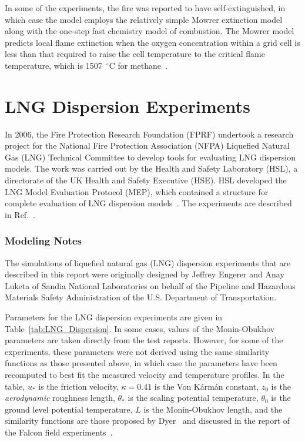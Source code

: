 In some of the experiments, the fire was reported to have self-extinguished, in which case the model employs the relatively simple Mowrer extinction model along with the one-step fast chemistry model of combustion. The Mowrer model predicts local flame extinction when the oxygen concentration within a grid cell is less than that required to raise the cell temperature to the critical flame temperature, which is 1507~$^\circ$C for methane~\cite{SFPE:Beyler}.


\section{LNG Dispersion Experiments}
\label{LNG_Dispersion_Description}

In 2006, the Fire Protection Research Foundation (FPRF) undertook a research project for the National Fire Protection Association (NFPA) Liquefied Natural Gas (LNG) Technical Committee to develop tools for evaluating LNG dispersion models. The work was carried out by the Health and Safety Laboratory (HSL), a directorate of the UK Health and Safety Executive (HSE). HSL developed the LNG Model Evaluation Protocol (MEP), which contained a structure for complete evaluation of LNG dispersion models~\cite{Ivings:HSL}. The experiments are described in Ref.~\cite{Stewart:HSL}.

\subsubsection{Modeling Notes}

The simulations of liquefied natural gas (LNG) dispersion experiments that are described in this report were originally designed by Jeffrey Engerer and Anay Luketa of Sandia National Laboratories on behalf of the Pipeline and Hazardous Materials Safety Administration of the U.S. Department of Transportation.

Parameters for the LNG dispersion experiments are given in Table~\ref{tab:LNG_Dispersion}. In some cases, values of the Monin-Obukhov parameters are taken directly from the test reports. However, for some of the experiments, these parameters were not derived using the same similarity functions as those presented above, in which case the parameters have been recomputed to best fit the measured velocity and temperature profiles. In the table, $u_*$ is the friction velocity, $\kappa=0.41$ is the Von K\'{a}rm\'{a}n constant, $z_0$ is the \emph{aerodynamic} roughness length, $\theta_*$ is the scaling potential temperature, $\theta_0$ is the ground level potential temperature, $L$ is the Monin-Obukhov length, and the similarity functions are those proposed by Dyer~\cite{Dyer:1974} and discussed in the report of the Falcon field experiments~\cite{Falcon}.

